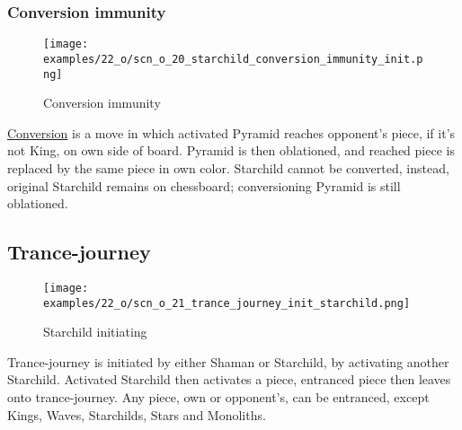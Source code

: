 \clearpage %

\subsubsection*{Conversion immunity}

\vspace*{-1.4\baselineskip}
\noindent
\begin{figure}[!h]
\texttt{[image: examples/22\_o/scn\_o\_20\_starchild\_conversion\_immunity\_init.png]}
\caption{Conversion immunity}
\label{fig:scn_o_20_starchild_conversion_immunity_init}
\end{figure}

\hyperref[sec:Mayan Ascendancy/Pyramid/Conversion]{Conversion} is a move in which
activated Pyramid reaches opponent's piece, if it's not King, on own side of board.
Pyramid is then oblationed, and reached piece is replaced by the same piece in own
color. Starchild cannot be converted, instead, original Starchild remains on
chessboard; conversioning Pyramid is still oblationed.

\clearpage %

\subsection*{Trance-journey}

\vspace*{-1.1\baselineskip}
\noindent
\begin{wrapfigure}[11]{l}{0.4\textwidth}
\centering
\texttt{[image: examples/22\_o/scn\_o\_21\_trance\_journey\_init\_starchild.png]}
\caption{Starchild initiating}
\label{fig:scn_o_21_trance_journey_init_starchild}
\end{wrapfigure}
Trance-journey is initiated by either Shaman or Starchild, by activating another
Starchild. Activated Starchild then activates a piece, entranced piece then leaves
onto trance-journey. Any piece, own or opponent's, can be entranced, except Kings,
Waves, Starchilds, Stars and Monoliths.

